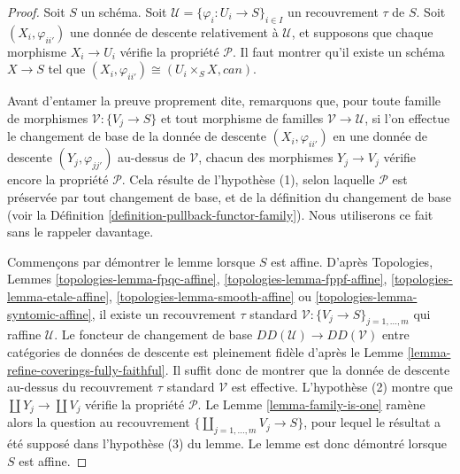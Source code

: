 \begin{proof}
Soit $S$ un schéma. Soit
$\mathcal{U} = \{\varphi_i : U_i \to S\}_{i \in I}$ un recouvrement
$\tau$ de $S$. Soit $(X_i, \varphi_{ii'})$ une donnée de descente relativement
à $\mathcal{U}$, et supposons que chaque morphisme $X_i \to U_i$ vérifie la
propriété $\mathcal{P}$. Il faut montrer qu'il existe un schéma $X \to S$ tel
que $(X_i, \varphi_{ii'}) \cong (U_i \times_S X, can)$.

\medskip\noindent
Avant d'entamer la preuve proprement dite, remarquons que, pour toute famille
de morphismes $\mathcal{V} : \{V_j \to S\}$ et tout morphisme de familles
$\mathcal{V} \to \mathcal{U}$, si l'on effectue le changement de base de la
donnée de descente $(X_i, \varphi_{ii'})$ en une donnée de descente
$(Y_j, \varphi_{jj'})$ au-dessus de $\mathcal{V}$, chacun des morphismes
$Y_j \to V_j$ vérifie encore la propriété $\mathcal{P}$. Cela résulte de
l'hypothèse (1), selon laquelle $\mathcal{P}$ est préservée par tout changement
de base, et de la définition du changement de base (voir la
Définition \ref{definition-pullback-functor-family}). Nous utiliserons ce fait
sans le rappeler davantage.

\medskip\noindent
Commençons par démontrer le lemme lorsque $S$ est affine. D'après Topologies,
Lemmes \ref{topologies-lemma-fpqc-affine},
\ref{topologies-lemma-fppf-affine},
\ref{topologies-lemma-etale-affine},
\ref{topologies-lemma-smooth-affine} ou
\ref{topologies-lemma-syntomic-affine}, il existe un recouvrement
$\tau$ standard
$\mathcal{V} : \{V_j \to S\}_{j = 1, \ldots, m}$ qui raffine
$\mathcal{U}$. Le foncteur de changement de base
$DD(\mathcal{U}) \to DD(\mathcal{V})$ entre catégories de données de descente
est pleinement fidèle d'après le
Lemme \ref{lemma-refine-coverings-fully-faithful}. Il suffit donc de montrer
que la donnée de descente au-dessus du recouvrement $\tau$ standard
$\mathcal{V}$ est effective. L'hypothèse (2) montre que
$\coprod Y_j \to \coprod V_j$ vérifie la propriété $\mathcal{P}$. Le
Lemme \ref{lemma-family-is-one} ramène alors la question au recouvrement
$\{\coprod_{j = 1, \ldots, m} V_j \to S\}$, pour lequel le résultat a été
supposé dans l'hypothèse (3) du lemme. Le lemme est donc démontré lorsque $S$
est affine.


\end{proof}
